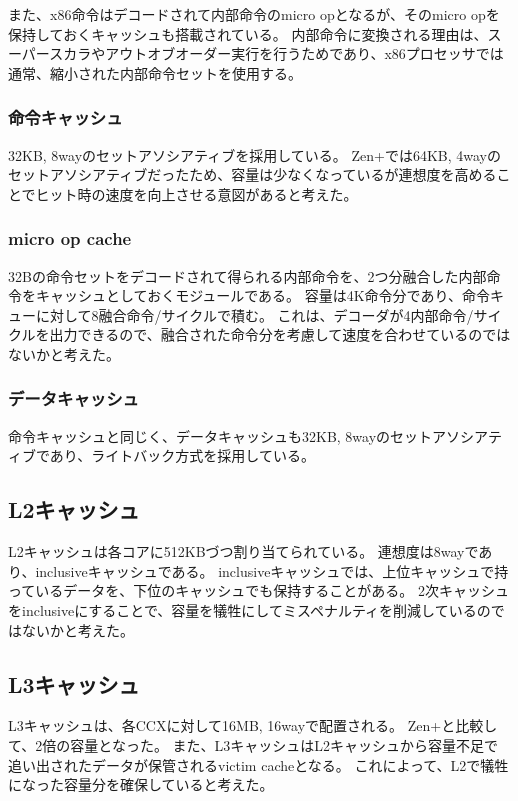 \documentclass[a4paper,10pt]{jsarticle}
\begin{document}
また、x86命令はデコードされて内部命令のmicro opとなるが、そのmicro opを保持しておくキャッシュも搭載されている。
内部命令に変換される理由は、スーパースカラやアウトオブオーダー実行を行うためであり、x86プロセッサでは通常、縮小された内部命令セットを使用する。

\subsubsection{命令キャッシュ}
32KB, 8wayのセットアソシアティブを採用している。
Zen+では64KB, 4wayのセットアソシアティブだったため、容量は少なくなっているが連想度を高めることでヒット時の速度を向上させる意図があると考えた。

\subsubsection{micro op cache}
32Bの命令セットをデコードされて得られる内部命令を、2つ分融合した内部命令をキャッシュとしておくモジュールである。
容量は4K命令分であり、命令キューに対して8融合命令/サイクルで積む。
これは、デコーダが4内部命令/サイクルを出力できるので、融合された命令分を考慮して速度を合わせているのではないかと考えた。

\subsubsection{データキャッシュ}
命令キャッシュと同じく、データキャッシュも32KB, 8wayのセットアソシアティブであり、ライトバック方式を採用している。

\subsection{L2キャッシュ}
L2キャッシュは各コアに512KBづつ割り当てられている。
連想度は8wayであり、inclusiveキャッシュである。
inclusiveキャッシュでは、上位キャッシュで持っているデータを、下位のキャッシュでも保持することがある。
2次キャッシュをinclusiveにすることで、容量を犠牲にしてミスペナルティを削減しているのではないかと考えた。

\subsection{L3キャッシュ}
L3キャッシュは、各CCXに対して16MB, 16wayで配置される。
Zen+と比較して、2倍の容量となった。
また、L3キャッシュはL2キャッシュから容量不足で追い出されたデータが保管されるvictim cacheとなる。
これによって、L2で犠牲になった容量分を確保していると考えた。
\end{document}
